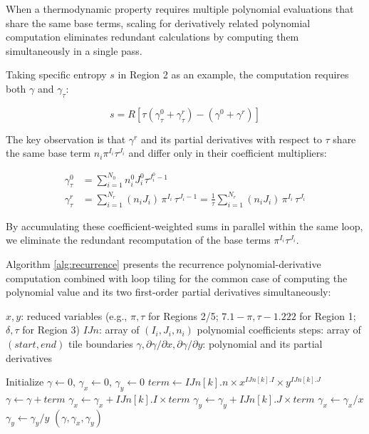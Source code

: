 \documentclass{article}
\begin{document}
When a thermodynamic property requires multiple polynomial evaluations that share the same base terms, scaling for derivatively related polynomial computation eliminates redundant calculations by computing them simultaneously in a single pass.

Taking specific entropy $s$ in Region 2 as an example, the computation requires both $\gamma$ and $\gamma_\tau$:

\begin{equation}
s = R \left[ \tau \left( \gamma^0_\tau + \gamma^r_\tau \right) - \left( \gamma^0 + \gamma^r \right) \right]
\end{equation}

The key observation is that $\gamma^r$ and its partial derivatives with respect to $\tau$ share the same base term $n_i \pi^{I_i} \tau^{J_i}$ and differ only in their coefficient multipliers:

\begin{align}
\gamma^0_\tau &= \sum_{i=1}^{N_0} n_i^0 J_i^0 \tau^{J_i^0 - 1} \\
\gamma^r_\tau &= \sum_{i=1}^{N_r} (n_i J_i) \, \pi^{I_i} \, \tau^{J_i-1} = \frac{1}{\tau} \sum_{i=1}^{N_r} (n_i J_i) \, \pi^{I_i} \, \tau^{J_i}
\end{align}

By accumulating these coefficient-weighted sums in parallel within the same loop, we eliminate the redundant recomputation of the base terms $\pi^{I_i} \tau^{J_i}$.

Algorithm \ref{alg:recurrence} presents the recurrence polynomial-derivative computation combined with loop tiling for the common case of computing the polynomial value and its two first-order partial derivatives simultaneously:

\begin{algorithm}[H]
\caption{Scaling for Derivatively Related Polynomial Computation with Loop Tiling}
\label{alg:recurrence}
\begin{algorithmic}[1]
\REQUIRE $x, y$: reduced variables (e.g., $\pi, \tau$ for Regions 2/5; $7.1{-}\pi, \tau{-}1.222$ for Region 1; $\delta, \tau$ for Region 3)
\REQUIRE $IJn$: array of $(I_i, J_i, n_i)$ polynomial coefficients
\REQUIRE $\text{steps}$: array of $(start, end)$ tile boundaries
\ENSURE $\gamma, \partial\gamma/\partial x, \partial\gamma/\partial y$: polynomial and its partial derivatives

\STATE Initialize $\gamma \leftarrow 0$, $\gamma_x \leftarrow 0$, $\gamma_y \leftarrow 0$
        \STATE $term \leftarrow IJn[k].n \times x^{IJn[k].I} \times y^{IJn[k].J}$
        \STATE $\gamma \leftarrow \gamma + term$
        \STATE $\gamma_x \leftarrow \gamma_x + IJn[k].I \times term$
        \STATE $\gamma_y \leftarrow \gamma_y + IJn[k].J \times term$
    \ENDFOR
\ENDFOR
\STATE $\gamma_x \leftarrow \gamma_x / x$
\STATE $\gamma_y \leftarrow \gamma_y / y$
\RETURN $(\gamma, \gamma_x, \gamma_y)$
\end{algorithmic}
\end{algorithm}
\end{document}
